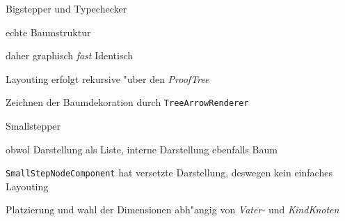  {

  \begin{itemgroup}{Bigstepper und Typechecker}
    \item echte Baumstruktur
    \item daher graphisch {\it fast} Identisch
    \item Layouting erfolgt rekursive "uber den {\it ProofTree}
    \item Zeichnen der Baumdekoration durch {\tt TreeArrowRenderer}
  \end{itemgroup}

}

 {

  \begin{itemgroup}{Smallstepper}
    \item obwol Darstellung als Liste, interne Darstellung ebenfalls Baum
    \item {\tt SmallStepNodeComponent} hat versetzte Darstellung, deswegen kein einfaches Layouting
    \item Platzierung und wahl der Dimensionen abh"angig von {\it Vater-} und {\it KindKnoten}
  
  
  \end{itemgroup}
 
}


